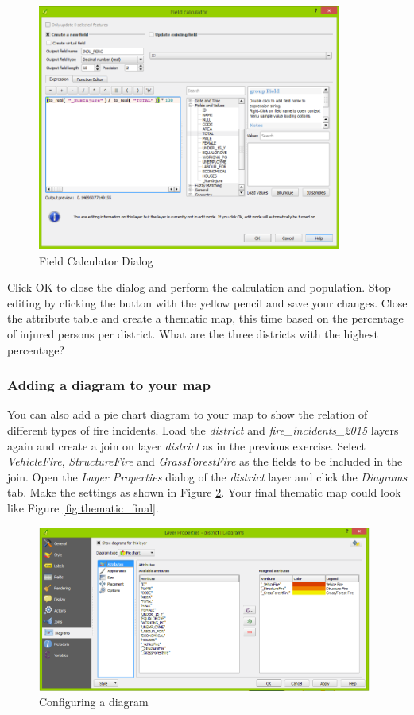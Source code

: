 \documentclass[a4paper,12pt,titlepage]{article}
\begin{document}
\begin{figure}[h]
\centering
\includegraphics[width=10cm]{Images/field_calculator.png}
\caption{Field Calculator Dialog}\label{fig:field_calculator}
\end{figure}

Click OK to close the dialog and perform the calculation and population. Stop editing by clicking the button with the yellow pencil and save your changes. Close the attribute table and create a thematic map, this time based on the percentage of injured persons per district. What are the three districts with the highest percentage?

\subsubsection{Adding a diagram to your map}
You can also add a pie chart diagram to your map to show the relation of different types of fire incidents. Load the \textit{district} and \textit{fire\_incidents\_2015} layers again and create a join on layer \textit{district} as in the previous exercise. Select \textit{VehicleFire}, \textit{StructureFire} and \textit{GrassForestFire} as the fields to be included in the join. Open the \textit{Layer Properties} dialog of the \textit{district} layer and click the \textit{Diagrams} tab. Make the settings as shown in Figure \ref{fig:diagram}. Your final thematic map could look like Figure \ref{fig:thematic_final}.

\begin{figure}[htb]
\centering
\includegraphics[width=11cm]{Images/diagram.png}
\caption{Configuring a diagram}\label{fig:diagram}
\end{figure}
\end{document}
